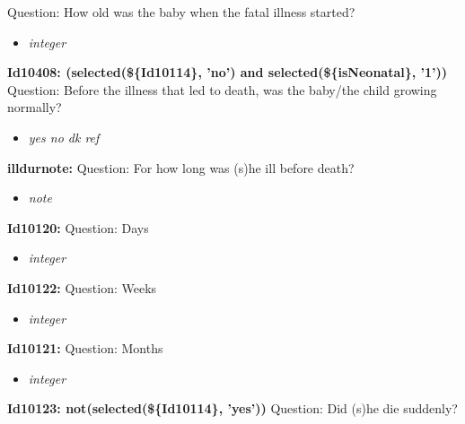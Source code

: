 \documentclass{article}%
\begin{document}
Question: How old was the baby when the fatal illness started?\newline%
%
\begin{itemize}%
\item%
\textit{integer\newline%
}%
\end{itemize}%
\textbf{Id10408: (selected(\$\{Id10114\}, 'no') and selected(\$\{isNeonatal\}, '1'))\newline%
}%
Question: Before the illness that led to death, was the baby/the child growing normally?\newline%
%
\begin{itemize}%
\item%
\textit{yes\newline%
 no\newline%
 dk\newline%
 ref\newline%
}%
\end{itemize}%
\textbf{illdurnote: \newline%
}%
Question: For how long was (s)he ill before death? \newline%
%
\begin{itemize}%
\item%
\textit{note\newline%
}%
\end{itemize}%
\textbf{Id10120: \newline%
}%
Question: Days\newline%
%
\begin{itemize}%
\item%
\textit{integer\newline%
}%
\end{itemize}%
\textbf{Id10122: \newline%
}%
Question: Weeks\newline%
%
\begin{itemize}%
\item%
\textit{integer\newline%
}%
\end{itemize}%
\textbf{Id10121: \newline%
}%
Question: Months\newline%
%
\begin{itemize}%
\item%
\textit{integer\newline%
}%
\end{itemize}%
\textbf{Id10123: not(selected(\$\{Id10114\}, 'yes'))\newline%
}%
Question: Did (s)he die suddenly?\newline%
\end{document}
